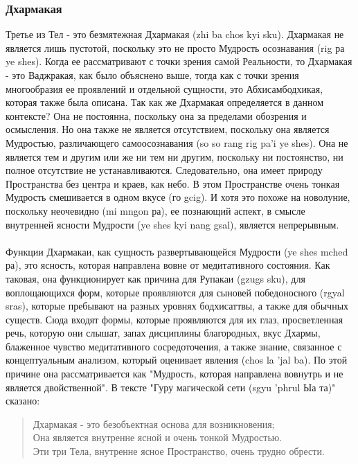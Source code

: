 \subsubsection{Дхармакая}

Третье из Тел - это безмятежная Дхармакая (zhi ba chos kyi sku). Дхармакая не
является лишь пустотой, поскольку это не просто Мудрость осознавания (rig ра ye shes).
Когда ее рассматривают с точки зрения самой Реальности, то Дхармакая - это Ваджракая, как
было объяснено выше, тогда как с точки зрения многообразия ее проявлений и отдельной
сущности, это Абхисамбодхикая, которая также была описана. Так как же Дхармакая
определяется в данном контексте? Она не постоянна, поскольку она за пределами обозрения
и осмысления. Но она также не является отсутствием, поскольку она является Мудростью,
различающего самоосознавания (so so rang rig pa'i ye shes). Она не является тем и другим или
же ни тем ни другим, поскольку ни постоянство, ни полное отсутствие не устанавливаются.
Следовательно, она имеет природу Пространства без центра и краев, как небо. В этом
Пространстве очень тонкая Мудрость смешивается в одном вкусе (го gcig). И хотя это
похоже на новолуние, поскольку неочевидно (mi mngon ра), ее познающий аспект, в смысле
внутренней ясности Мудрости (ye shes kyi nang gsal), является непрерывным.\\
\\
Функции Дхармакаи, как сущность развертывающейся Мудрости (ye shes mched ра),
это ясность, которая направлена вовне от медитативного состояния. Как таковая, она
функционирует как причина для Рупакаи (gzugs sku), для воплощающихся форм, которые
проявляются для сыновей победоносного (rgyal sras), которые пребывают на разных уровнях
бодхисаттвы, а также для обычных существ. Сюда входят формы, которые проявляются для
их глаз, просветленная речь, которую они слышат, запах дисциплины благородных, вкус
Дхармы, блаженное чувство медитативного сосредоточения, а также знание, связанное с
концептуальным анализом, который оценивает явления (chos la 'jal ba). По этой причине она
рассматривается как "Мудрость, которая направлена вовнутрь и не является двойственной".
В тексте "Гуру магической сети (sgyu 'phrul Ыа та)" сказано:\\

\begin{verse}
Дхармакая - это безобъектная основа для возникновения;\\
Она является внутренне ясной и очень тонкой Мудростью.\\
Эти три Тела, внутренне ясное Пространство, очень трудно обрести.
\end{verse}

